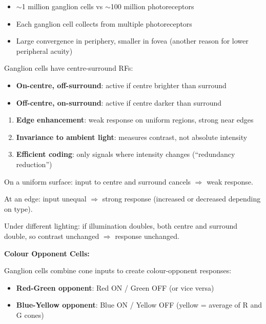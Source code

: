 \begin{itemize}
  \item $\sim$1 million ganglion cells vs $\sim$100 million photoreceptors
  \item Each ganglion cell collects from multiple photoreceptors
  \item Large convergence in periphery, smaller in fovea (another reason for lower peripheral acuity)
\end{itemize}

\separator

\begin{defbox}
Ganglion cells have centre-surround RFs:
\begin{itemize}
  \item \textbf{On-centre, off-surround}: active if centre brighter than surround
  \item \textbf{Off-centre, on-surround}: active if centre darker than surround
\end{itemize}
\end{defbox}

\begin{thmbox}
\begin{enumerate}
  \item \textbf{Edge enhancement}: weak response on uniform regions, strong near edges
  \item \textbf{Invariance to ambient light}: measures contrast, not absolute intensity
  \item \textbf{Efficient coding}: only signals where intensity changes (``redundancy reduction'')
\end{enumerate}
\end{thmbox}

\begin{exbox}
On a uniform surface: input to centre and surround cancels $\Rightarrow$ weak response.

At an edge: input unequal $\Rightarrow$ strong response (increased or decreased depending on type).

Under different lighting: if illumination doubles, both centre and surround double, so contrast unchanged $\Rightarrow$ response unchanged.
\end{exbox}

\separator

\textbf{Colour Opponent Cells:}

Ganglion cells combine cone inputs to create colour-opponent responses:
\begin{itemize}
  \item \textbf{Red-Green opponent}: Red ON / Green OFF (or vice versa)
  \item \textbf{Blue-Yellow opponent}: Blue ON / Yellow OFF (yellow = average of R and G cones)
\end{itemize}

